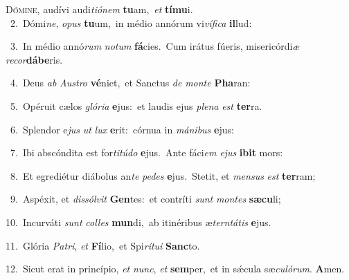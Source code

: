 \lettrine{\initial\textcolor{\initialcolor}{D}}{ómine,} audívi audi\-\textit{ti}\-\textit{ó}\textit{nem} \textbf{tu}\-am,~\star \textit{et} \textbf{tí}\-\textbf{mu}i.\\
{\numbfont\textcolor{\numbcolor}{~2.}}~Dómi\-\textit{ne}\-, \textit{o}\-\textit{pus} \textbf{tu}\-um,~\star in médio annórum vi\-\textit{ví}\-\textit{fi}\textit{ca} \textbf{il}\-lud:\par
{\numbfont\textcolor{\numbcolor}{~3.}}~In médio annó\textit{rum} \textit{no}\-\textit{tum} \textbf{fá}\-cies.~\star Cum irátus fúeris, misericórdi\textit{æ} \textit{re}\-\textit{cor}\textbf{dá}\textbf{be}ris.\par
{\numbfont\textcolor{\numbcolor}{~4.}}~Deus \textit{ab} \textit{Aus}\-\textit{tro} \textbf{vé}\-niet,~\star et Sanctus \textit{de} \textit{mon}\-\textit{te} \textbf{Pha}\-ran:\par
{\numbfont\textcolor{\numbcolor}{~5.}}~Opéruit cælos \textit{gló}\-\textit{ri}\textit{a} \textbf{e}\-jus:~\star et laudis ejus \textit{ple}\-\textit{na} \textit{est} \textbf{ter}\-ra.\par
{\numbfont\textcolor{\numbcolor}{~6.}}~Splendor e\textit{jus} \textit{ut} \textit{lux} \textbf{e}\-rit:~\star córnua in \textit{má}\-\textit{ni}\textit{bus} \textbf{e}\-jus:\par
{\numbfont\textcolor{\numbcolor}{~7.}}~Ibi abscóndita est for\-\textit{ti}\-\textit{tú}\textit{do} \textbf{e}\-jus.~\star Ante fáci\textit{em} \textit{e}\-\textit{jus} \textbf{i}\-\textbf{bit} mors:\par
{\numbfont\textcolor{\numbcolor}{~8.}}~Et egrediétur diábolus an\textit{te} \textit{pe}\-\textit{des} \textbf{e}\-jus.~\star Stetit, et \textit{men}\-\textit{sus} \textit{est} \textbf{ter}\-ram;\par
{\numbfont\textcolor{\numbcolor}{~9.}}~Aspéxit, et \textit{dis}\-\textit{sól}\textit{vit} \textbf{Gen}\-tes:~\star et contríti \textit{sunt} \textit{mon}\-\textit{tes} \textbf{sæ}\-\textbf{cu}li;\par
{\numbfont\textcolor{\numbcolor}{10.}}~Incurváti \textit{sunt} \textit{col}\-\textit{les} \textbf{mun}\-di,~\star ab itinéribus æ\-\textit{tern}\-\textit{tá}\textit{tis} \textbf{e}\-jus.\par
{\numbfont\textcolor{\numbcolor}{11.}}~Glória \textit{Pa}\-\textit{tri}, \textit{et} \textbf{Fí}\-lio,~\star et Spi\-\textit{rí}\-\textit{tu}\textit{i} \textbf{Sanc}\-to.\par
{\numbfont\textcolor{\numbcolor}{12.}}~Sicut erat in princípio, \textit{et} \textit{nunc}\-, \textit{et} \textbf{sem}\-per,~\star et in sǽcula sæ\-\textit{cu}\-\textit{ló}\textit{rum}. \textbf{A}\-men.\par
